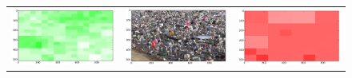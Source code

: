 \begin{figure}[h!tb]
\begin{minipage}{1.3\textwidth}
\begin{tabular}{ccc}
\includegraphics[keepaspectratio=true,width=\segwidth]{images/segment/253_01__animals__.png} &
\includegraphics[keepaspectratio=true,width=\segwidth]{images/segment/253_01__image__.png} &
\includegraphics[keepaspectratio=true,width=\segwidth]{images/segment/253_01__plastic__.png} \\


\end{tabular}
\end{minipage}
\end{figure}
